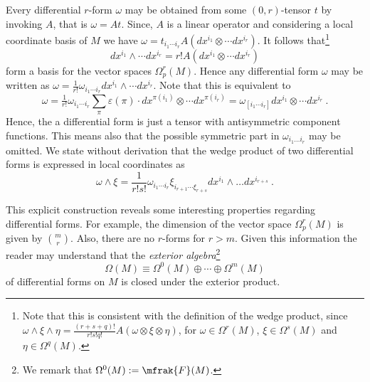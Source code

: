 \documentclass[10pt,reqno]{amsart}
\numberwithin{equation}{section}
\begin{document}
Every differential $r$-form $\omega$ may be obtained from some 
$(0,r)$-tensor $t$ by invoking $A$, that is $\omega = At$. Since, 
$A$ is a linear operator and considering a local coordinate basis 
of $M$ we have $\omega = t_{i_1\cdots i_r} A(dx^{i_1}\otimes 
\cdots dx^{i_r})$. It follows that\footnote{Note that this is 
	consistent with the definition of the wedge product, since 
	$\omega \wedge \xi \wedge \eta = \tfrac{(r+s+q)!}{r!s!q!} 
	A(\omega \otimes \xi \otimes \eta)$, for $\omega \in 
	\Omega^r(M)$, $\xi \in \Omega^s(M)$ and $\eta \in 
	\Omega^q(M)$.}
%
\begin{displaymath}
	dx^{i_1}\wedge\cdots dx^{i_r} = r!  A(dx^{i_1}\otimes\cdots 
	dx^{i_r})
\end{displaymath}
form a basis for the vector spaces $\Omega^r_p(M)$. Hence any 
differential form $\omega$ may be written as $\omega = 
\tfrac{1}{r!}\omega_{i_1\cdots i_r} dx^{i_1}\wedge\cdots 
dx^{i_r}$. Note that this is equivalent to
%
\begin{equation}
	\omega = \tfrac{1}{r!} \omega_{i_1\cdots i_r} \sum_\pi 
	\varepsilon(\pi)\cdot dx^{\pi(i_1)}\otimes\cdots dx^{\pi(i_r)} 
	= \omega_{[i_1\cdots i_r]} dx^{i_1}\otimes\cdots dx^{i_r}~.  
\end{equation}
Hence, the a differential form is just a tensor with 
antisymmetric component functions. This means also that the 
possible symmetric part in $\omega_{i_1\dots i_r}$ may be 
omitted. We state without derivation that the wedge product of 
two differential forms is expressed in local coordinates as
%
\begin{equation}
	\omega \wedge \xi = \frac{1}{r!s!} \omega_{i_1\cdots i_r} 
	\xi_{i_{r+1}\cdots \xi_{r+s}} dx^{i_1}\wedge \ldots 
	dx^{i_{r+s}}~.
\end{equation}

This explicit construction reveals some interesting properties 
regarding differential forms. For example, the dimension of the 
vector space $\Omega^r_p(M)$ is given by $\binom{m}{r}$. Also, 
there are no $r$-forms for $r > m$. Given this information the 
reader may understand that the \emph{exterior 
	algebra}\footnote{We remark that $\Omega^0(M) := 
	\mfrak{F}(M)$.}
\begin{equation}
	\Omega(M) \equiv \Omega^0(M) \oplus \cdots \oplus \Omega^m(M)
\end{equation}
of differential forms on $M$ is closed under the exterior 
product.
\end{document}
